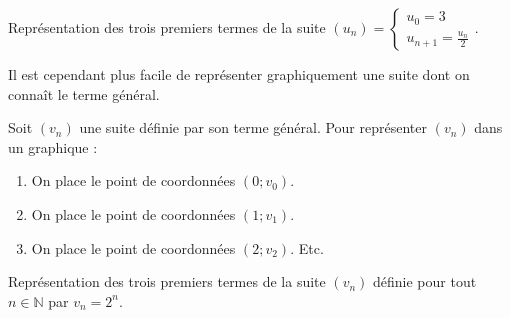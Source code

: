	\begin{tip}[Exemple]
		Représentation des trois premiers termes de la suite $(u_n) = \begin{cases} u_0 = 3 \\ u_{n+1} = \frac{u_n}{2} \end{cases}$.
	\end{tip}
	
	Il est cependant plus facile de représenter graphiquement une suite dont on connaît le terme général.
	
	\begin{formula}
		Soit $(v_n)$ une suite définie par son terme général. Pour représenter $(v_n)$ dans un graphique :
		\begin{enumerate}
			\item On place le point de coordonnées $(0; v_0)$.
			\item On place le point de coordonnées $(1; v_1)$.
			\item On place le point de coordonnées $(2; v_2)$. Etc.
		\end{enumerate}
	\end{formula}
	
	\begin{tip}[Exemple]
		Représentation des trois premiers termes de la suite $(v_n)$ définie pour tout $n \in \mathbb{N}$ par $v_n = 2^n$.
	\end{tip}
